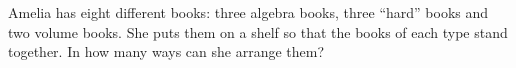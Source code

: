 Amelia has eight different books: three algebra books, three ``hard'' books and two volume books. She puts them on a shelf so that the books of each type stand together. In how many ways can she arrange them?
